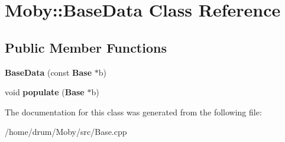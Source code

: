\section{Moby\-:\-:Base\-Data Class Reference}
\label{classMoby_1_1BaseData}
\subsection*{Public Member Functions}
\begin{DoxyCompactItemize}
\item 
{\bfseries Base\-Data} (const {\bf Base} $\ast$b)\label{classMoby_1_1BaseData_a594764afb4eddddf3395f9fb369a50bf}

\item 
void {\bfseries populate} ({\bf Base} $\ast$b)\label{classMoby_1_1BaseData_abcfb4838b9f9b5f7cd739bafbc3b125a}

\end{DoxyCompactItemize}


The documentation for this class was generated from the following file\-:\begin{DoxyCompactItemize}
\item 
/home/drum/\-Moby/src/Base.\-cpp\end{DoxyCompactItemize}
